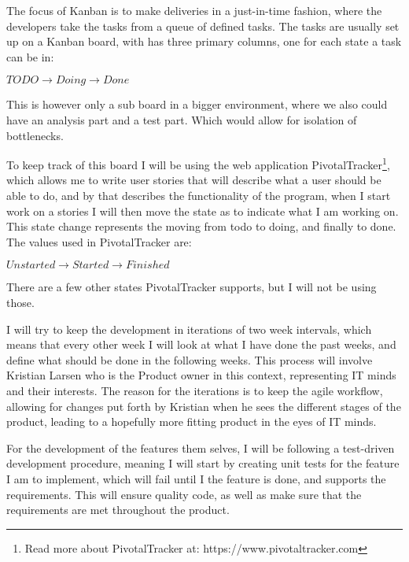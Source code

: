 The focus of Kanban is to make deliveries in a just-in-time fashion, where the
developers take the tasks from a queue of defined tasks. The tasks are usually
set up on a Kanban board, with has three primary columns, one for each state a
task can be in: 

\begin{center}
  $TODO \rightarrow Doing \rightarrow Done$
\end{center}

This is however only a sub board in a bigger environment, where we also could
have an analysis part and a test part. Which would allow for isolation of
bottlenecks\cite{kanban}. 

To keep track of this board I will be using the web application
PivotalTracker\footnote{Read more about PivotalTracker at:
  https://www.pivotaltracker.com}, which allows me to write user stories that
will describe what a user should be able to do, and by that describes the
functionality of the program, when I start work on a stories I will then move
the state as to indicate what I am working on. This state change represents the
moving from todo to doing, and finally to done. The values used in
PivotalTracker are: 

\begin{center}
  $Unstarted \rightarrow Started \rightarrow Finished$
\end{center}

There are a few other states PivotalTracker supports, but I will not be using
those. 

I will try to keep the development in iterations of two week intervals, which
means that every other week I will look at what I have done the past weeks, and define
what should be done in the following weeks. This process will involve Kristian Larsen
who is the Product owner in this context, representing IT minds and their
interests. The reason for the iterations is to keep the agile workflow, allowing
for changes put forth by Kristian when he sees the different stages of the
product, leading to a hopefully more fitting product in the eyes of IT minds. 

For the development of the features them selves, I will be following a
test-driven development procedure, meaning I will start by creating unit tests
for the feature I am to implement, which will fail until I the feature is done,
and supports the requirements. This will ensure quality code, as well as make
sure that the requirements are met throughout the product. 

